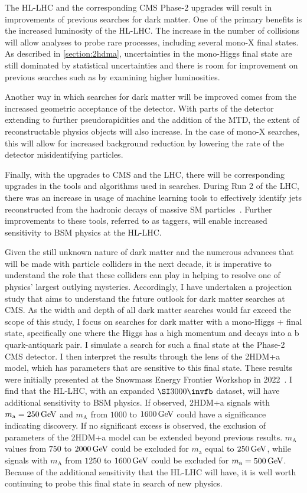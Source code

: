 The HL-LHC and the corresponding CMS Phase-2 upgrades will result in improvements of previous searches for dark matter. One of the primary benefits is the increased luminosity of the HL-LHC. The increase in the number of collisions will allow analyses to probe rare processes, including several mono-X final states. As described in \cref{section:2hdma}, uncertainties in the mono-Higgs final state are still dominated by statistical uncertainties and there is room for improvement on previous searches such as \cite{cms:hbb2019,atlas:hbb2017,atlas:hbb2021} by examining higher luminosities.

Another way in which searches for dark matter will be improved comes from the increased geometric acceptance of the detector. With parts of the detector extending to further pseudorapidities and the addition of the MTD, the extent of reconstructable physics objects will also increase. In the case of mono-X searches, this will allow for increased background reduction by lowering the rate of the detector misidentifying particles.

Finally, with the upgrades to CMS and the LHC, there will be corresponding upgrades in the tools and algorithms used in searches. During Run 2 of the LHC, there was an increase in usage of machine learning tools to effectively identify jets reconstructed from the hadronic decays of massive SM particles~\cite{CMS:2020mlt}. Further improvements to these tools, referred to as taggers, will enable increased sensitivity to BSM physics at the HL-LHC.

Given the still unknown nature of dark matter and the numerous advances that will be made with particle colliders in the next decade, it is imperative to understand the role that these colliders can play in helping to resolve one of physics' largest outlying mysteries. Accordingly, I have undertaken a projection study that aims to understand the future outlook for dark matter searches at CMS. As the width and depth of all dark matter searches would far exceed the scope of this study, I focus on searches for dark matter with a mono-Higgs + \ptmiss final state, specifically one where the Higgs has a high momentum and decays into a b quark-antiquark pair. I simulate a search for such a final state at the Phase-2 CMS detector. I then interpret the results through the lens of the 2HDM+a model, which has parameters that are sensitive to this final state. These results were initially presented at the Snowmass Energy Frontier Workshop in 2022~\cite{CMS-PAS-FTR-22-005}.
I find that the HL-LHC, with an expanded $\fbinv{3000}$ dataset, will have additional sensitivity to BSM physics. If observed, 2HDM+a signals with $m_\mathrm{a} = \GeV{250}$ and $m_\mathrm{A}$ from $1000$ to $\GeV{1600}$ could have a significance indicating discovery.
If no significant excess is observed, the exclusion of parameters of the 2HDM+a model can be extended beyond previous results. $m_\mathrm{A}$ values from $750$ to $\GeV{2000}$ could be excluded for $m_\mathrm{a}$ equal to $\GeV{250}$, while signals with $m_\mathrm{A}$ from $1250$ to $\GeV{1600}$ could be excluded for $m_\mathrm{a} = \GeV{500}$. Because of the additional sensitivity that the HL-LHC will have, it is well worth continuing to probe this final state in search of new physics.